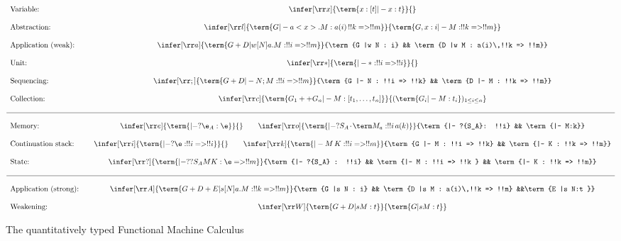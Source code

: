 \documentclass[10pt,a4paper]{amsart}
\newcommand\vc[1]{\vcenter{\hbox{\ensuremath{#1}}}}
\newcommand\msep{\kern1pt{\cdot}\kern1pt}
\begin{document}
\begin{figure}
\[
\begin{array}{l@{\qquad}c}
		\text{Variable:}			&\vc{\infer[\rr x]{\term{x:[t] |- x:t}}{}}
\\ \\	\text{Abstraction:} 		&\vc{\infer[\rr l]{\term{G |- a<x>.M : a(i)\,!!k => !!m}}{\term{G, x:i |- M: !!k => !!m}}}
\\ \\	\text{Application (weak):} 	&\vc{\infer[\rr a]{\term{G+D |w [N]a.M : !!i => !!m}}{\term{G |w N : i} && \term{D |w M : a(i)\,!!k => !!m}}}
\\ \\	\text{Unit:}				&\vc{\infer[\rr *]{\term{|- * : !!i => !!i}}{}}
\\ \\	\text{Sequencing:}			&\vc{\infer[\rr ;]{\term{G+D |- N;M : !!i => !!m}}{\term{G |- N : !!i => !!k} && \term{D |- M : !!k => !!m}}}
\\ \\	\text{Collection:}			&\vc{\infer[\rr c]{\term{G_1 ++ G_n |- M : [t_1,\dots,t_n]}}{(\term{G_i |- M : t_i})_{1\leq i\leq n}}}
\\ \\   \hline
\\   	\text{Memory:}              &\vc{\infer[\rr e]{\term{|- ?{\e_A} : \e}}{} \qquad \infer[\rr o]{\term{|- ?{S_A\msep\term M_a} : !!i\,a(k)}}{\term{|- ?{S_A}: !!i} && \term{|- M:k}}}
\\ \\	\text{Continuation stack:}	&\vc{\infer[\rr i]{\term{|- ?{\e} : !!i => !!i}}{} \qquad \infer[\rr k]{\term{|- M\,K : !!i => !!m}}{\term{G |- M : !!i => !!k} && \term{|- K : !!k => !!m}}}
\\ \\	\text{State:}				&\vc{\infer[\rr ?]{\term{|- ??{S_A}MK : \e => !!m}}{\term{|- ?{S_A} : !!i} && \term{|- M : !!i => !!k } && \term{|- K : !!k => !!m}}}
\\ \\	\hline 
\\		\text{Application (strong):}&\vc{\infer[\rr A]{\term{G+D+E |s [N]a.M : !!k => !!m}}{\term{G |s N : i} && \term{D |s M : a(i)\,!!k => !!m} &&\term{E |s N:t }}}
\\ \\	\text{Weakening:}			&\vc{\infer[\rr W]{\term{G+D |s M : t}}{\term{G |s M : t}}}
\end{array}
\]
\caption{The quantitatively typed Functional Machine Calculus}
\label{fig:types}
\end{figure}
\end{document}
